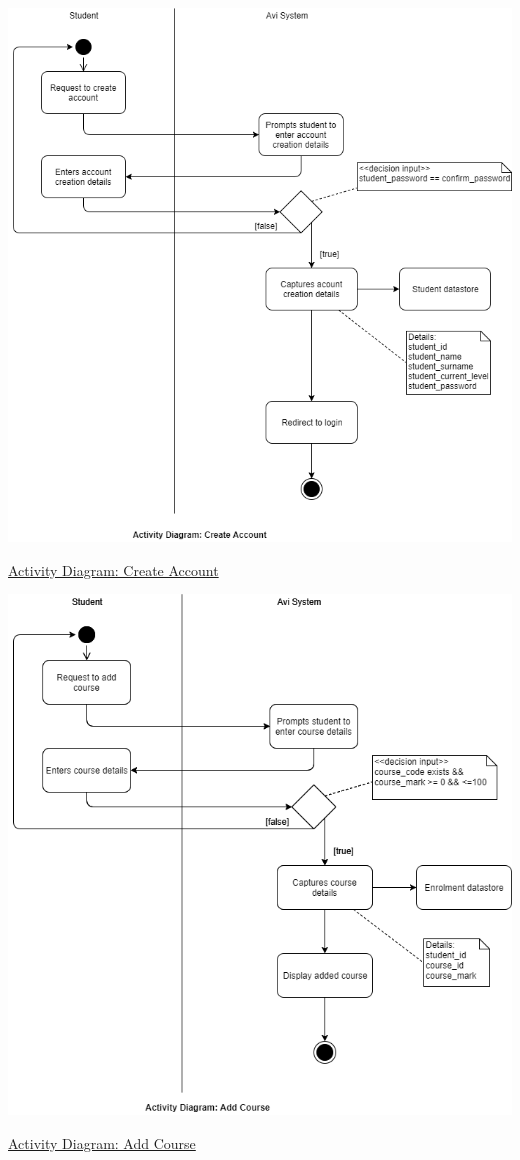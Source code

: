 \documentclass[10pt]{article}
\begin{document}
\begin{center}
\includegraphics[width=.9\textwidth]{activity_diagram_create_account.png}
\end{center}
\caption{\underline{Activity Diagram: Create Account}}

\newpage

\begin{center}
\includegraphics[width=.9\textwidth]{activity_diagram_add.png}
\end{center}
\caption{\underline{Activity Diagram: Add Course}} \\ \\
\end{document}
